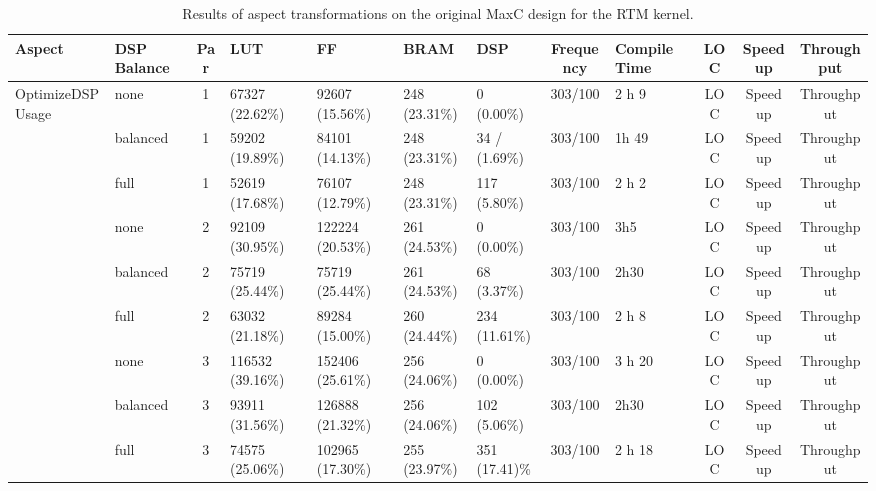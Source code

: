 \begin{table}
  \centering
  \caption{Results of aspect transformations on the original MaxC
    design for the RTM kernel.}
  \label{table:feature-comparison}
  \begin{tabular}{ p{2cm}  | p{1cm} | c|  p{1cm} |  p{1cm} |  p{1cm} |  p{1cm} | c | p{1cm} |c | c | c}
   Aspect                           & DSP Balance    & Par & LUT               & FF                & BRAM           & DSP            & Frequency & Compile Time & LOC & Speedup & Throughput \\ \hline
  \multirow{4}{*}{OptimizeDSPUsage} & none           & 1   & 67327 (22.62\%)   & 92607  (15.56\%)  & 248 (23.31\%)  & 0  (0.00\%)    & 303/100   & 2 h 9        & LOC & Speedup & Throughput \\
                                    & balanced       & 1   & 59202 (19.89\%)   & 84101 (14.13\%)   & 248 (23.31\%)  & 34 / (1.69\%)  & 303/100   & 1h 49        & LOC & Speedup & Throughput \\
                                    & full           & 1   & 52619  (17.68\%)  & 76107  (12.79\%)  & 248  (23.31\%) & 117  (5.80\%)  & 303/100   & 2 h 2        & LOC & Speedup & Throughput \\ \hline
                                    & none           & 2   & 92109 (30.95\%)   & 122224 (20.53\%)  & 261 (24.53\%)  & 0 (0.00\%)     & 303/100   & 3h5          & LOC & Speedup & Throughput \\
                                    & balanced       & 2   & 75719 (25.44\%)   & 75719 (25.44\%)   & 261 (24.53\%)  & 68 (3.37\%)    & 303/100   & 2h30         & LOC & Speedup & Throughput \\
                                    & full           & 2   & 63032  (21.18\%)  & 89284  (15.00\%)  & 260  (24.44\%) & 234  (11.61\%) & 303/100   & 2 h 8        & LOC & Speedup & Throughput \\
\hline
                                    & none           & 3   & 116532 (39.16\%)  & 152406 (25.61\%)  & 256 (24.06\%)  & 0 (0.00\%)     & 303/100   & 3 h 20       & LOC & Speedup & Throughput \\
                                    & balanced       & 3   & 93911 (31.56\%)   & 126888 (21.32\%)  & 256 (24.06\%)  & 102 (5.06\%)   & 303/100   & 2h30         & LOC & Speedup & Throughput \\
                                    & full           & 3   & 74575  (25.06\%)  & 102965  (17.30\%) & 255  (23.97\%) & 351  (17.41)\% & 303/100   & 2 h 18       & LOC & Speedup & Throughput \\

\end{tabular}
\end{table}
